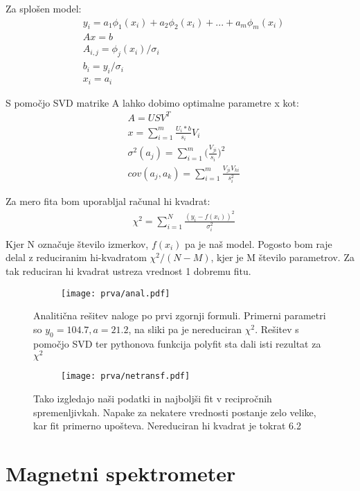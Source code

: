 \documentclass{article}
\begin{document}
Za splošen model:
\begin{align*}
&y_i = a_1 \phi_1(x_i) + a_2  \phi_2(x_i) + ... + a_m \phi_m(x_i) \\
&Ax = b \\
&A_{i,j} = \phi_j(x_i)/\sigma_i \\
&b_i = y_i/\sigma_i \\
&x_i = a_i
\end{align*}

S pomočjo SVD matrike A lahko dobimo optimalne parametre x kot:
\begin{align*}
&A = USV^T \\
&x = \sum_{i=1}^m \frac{U_i * b}{s_i} V_i \\
&\sigma^2(a_j) = \sum_{i = 1}^m \Big(\frac{V_{ji}}{s_i}\Big)^2 \\
&cov(a_j,a_k) = \sum_{i=1}^m \frac{V_{ji}V_{ki}}{s_i^2}
\end{align*}

Za mero fita bom uporabljal računal hi kvadrat:
\begin{align*}
& \chi^2 = \sum_{i=1}^N \frac{(y_i-f(x_i))^2}{\sigma_i^2} \\
\end{align*}
Kjer N označuje število izmerkov, $f(x_i)$ pa je naš model.
Pogosto bom raje delal z reduciranim hi-kvadratom $\chi^2/(N-M)$, kjer je M število parametrov. Za tak reduciran hi kvadrat ustreza vrednost 1 dobremu fitu.

\begin{figure}[H]
\begin{subfigure}{\textwidth}
\texttt{[image: prva/anal.pdf]}
\end{subfigure}
\caption*{Analitična rešitev naloge po prvi zgornji formuli. Primerni parametri so $y_0 = 104.7, a=21.2$, na sliki pa je nereduciran $\chi^2$. Rešitev s pomočjo SVD ter pythonova funkcija polyfit sta dali isti rezultat za $\chi^2$}
\end{figure}
\begin{figure}[H]
\begin{subfigure}{\textwidth}
\texttt{[image: prva/netransf.pdf]}
\end{subfigure}
\caption*{Tako izgledajo naši podatki in najboljši fit v recipročnih spremenljivkah. Napake za nekatere vrednosti postanje zelo velike, kar fit primerno upošteva. Nereduciran  hi kvadrat je tokrat 6.2}
\end{figure}
\newpage
\section{Magnetni spektrometer}
\end{document}
